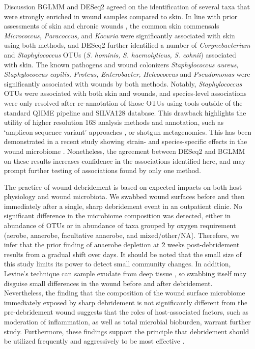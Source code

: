 \documentclass[oneside,12pt,final]{sty/ucthesis-CA2012}
\begin{document}
\begin{mainmatter}
\begin{section}{Discussion}
BGLMM and DESeq2 agreed on the identification of several taxa that were strongly enriched in wound samples compared to skin. In line with prior assessments of skin and chronic wounds \cite{RN6, RN7, RN8, RN36}, the common skin commensals \textit{Micrococcus, Paracoccus,} and \textit{Kocuria} were significantly associated with skin using both methods, and DESeq2 further identified a number of \textit{Corynebacterium} and \textit{Staphylococcus} OTUs (\textit{S. hominis, S. haemolyticus, S. cohnii}) associated with skin. The known pathogens and wound colonizers \textit{Staphylococcus aureus, Staphylococcus capitis, Proteus, Enterobacter, Helcococcus} and \textit{Pseudomonas} were significantly associated with wounds by both methods. Notably, \textit{Staphylococcus} OTUs were associated with both skin and wounds, and species-level associations were only resolved after re-annotation of those OTUs using tools outside of the standard QIIME pipeline and SILVA128 database. This drawback highlights the utility of higher resolution 16S analysis methods and annotation, such as ‘amplicon sequence variant’ approaches \cite{RN97}, or shotgun metagenomics. This has been demonstrated in a recent study showing strain- and species-specific effects in the wound microbiome \cite{RN8}. Nonetheless, the agreement between DESeq2 and BGLMM on these results increases confidence in the associations identified here, and may prompt further testing of associations found by only one method. 

The practice of wound debridement is based on expected impacts on both host physiology and wound microbiota. We swabbed wound surfaces before and then immediately after a single, sharp debridement event in an outpatient clinic. No significant difference in the microbiome composition was detected, either in abundance of OTUs or in abundance of taxa grouped by oxygen requirement (aerobe, anaerobe, facultative anaerobe, and mixed/other/NA). Therefore, we infer that the prior finding of anaerobe depletion at 2 weeks post-debridement results from a gradual shift over days. It should be noted that the small size of this study limits its power to detect small community changes. In addition, Levine’s technique can sample exudate from deep tissue \cite{RN37}, so swabbing itself may disguise small differences in the wound before and after debridement. Nevertheless, the finding that the composition of the wound surface microbiome immediately exposed by sharp debridement is not significantly different from the pre-debridement wound suggests that the roles of host-associated factors, such as moderation of inflammation, as well as total microbial bioburden, warrant further study. Furthermore, these findings support the principle that debridement should be utilized frequently and aggressively to be most effective \cite{RN48}.


\end{section}
\end{mainmatter}
\end{document}

